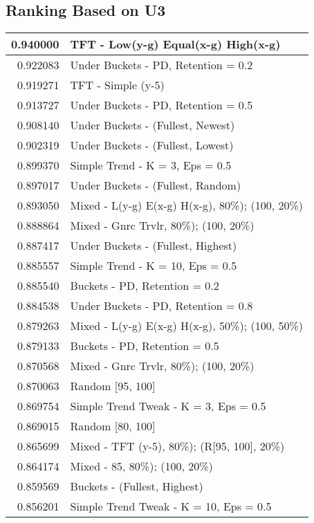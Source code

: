 \begin{table}[!hbtp]
\subsection{Ranking Based on U3}
\begin{footnotesize}
\begin{tabular}{|r|l|}\hline  \label{U3results}
0.940000 & TFT - Low(y-g) Equal(x-g) High(x-g)\\ \hline
0.922083 & Under Buckets - PD, Retention = 0.2\\ \hline
0.919271 & TFT - Simple (y-5)\\ \hline
0.913727 & Under Buckets - PD, Retention = 0.5\\ \hline
0.908140 & Under Buckets - (Fullest, Newest)\\ \hline
0.902319 & Under Buckets - (Fullest, Lowest)\\ \hline
0.899370 & Simple Trend - K = 3, Eps = 0.5\\ \hline
0.897017 & Under Buckets - (Fullest, Random)\\ \hline
0.893050 & Mixed - {L(y-g) E(x-g) H(x-g), 80\%); (100, 20\%)}\\ \hline
0.888864 & Mixed - {Gnrc Trvlr, 80\%); (100, 20\%)}\\ \hline
0.887417 & Under Buckets - (Fullest, Highest)\\ \hline
0.885557 & Simple Trend - K = 10, Eps = 0.5\\ \hline
0.885540 & Buckets - PD, Retention = 0.2\\ \hline
0.884538 & Under Buckets - PD, Retention = 0.8\\ \hline
0.879263 & Mixed - {L(y-g) E(x-g) H(x-g), 50\%); (100, 50\%)}\\ \hline
0.879133 & Buckets - PD, Retention = 0.5\\ \hline
0.870568 & Mixed - {Gnrc Trvlr, 80\%); (100, 20\%)}\\ \hline
0.870063 & Random [95, 100]\\ \hline
0.869754 & Simple Trend Tweak - K = 3, Eps = 0.5\\ \hline
0.869015 & Random [80, 100]\\ \hline
0.865699 & Mixed - {TFT (y-5), 80\%); (R[95, 100], 20\%)}\\ \hline
0.864174 & Mixed - {85, 80\%); (100, 20\%)}\\ \hline
0.859569 & Buckets - (Fullest, Highest)\\ \hline
0.856201 & Simple Trend Tweak - K = 10, Eps = 0.5\\ \hline

\end{tabular}
\end{footnotesize}
\end{table}
